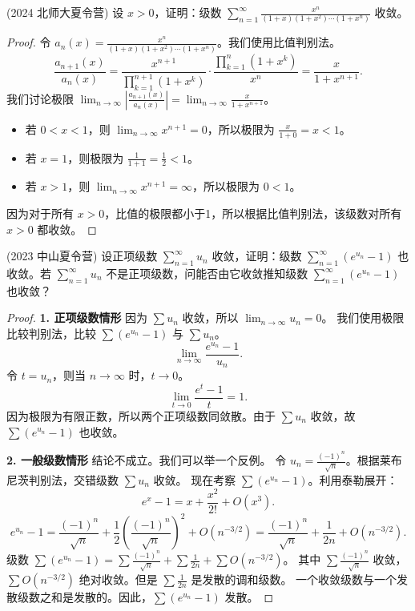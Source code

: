 \documentclass[lang=cn,10pt,thmcnt=section]{elegantbook}
\begin{document}
\begin{example}
    (2024 北师大夏令营) 设 $x > 0$，证明：级数 $\sum_{n=1}^{\infty} \frac{x^n}{(1+x)(1+x^2)\cdots(1+x^n)}$ 收敛。
\end{example}
\begin{proof}
    令 $a_n(x) = \frac{x^n}{(1+x)(1+x^2)\cdots(1+x^n)}$。我们使用比值判别法。
    \[ \frac{a_{n+1}(x)}{a_n(x)} = \frac{x^{n+1}}{\prod_{k=1}^{n+1}(1+x^k)} \cdot \frac{\prod_{k=1}^{n}(1+x^k)}{x^n} = \frac{x}{1+x^{n+1}}. \]
    我们讨论极限 $\lim_{n \to \infty} \left| \frac{a_{n+1}(x)}{a_n(x)} \right| = \lim_{n \to \infty} \frac{x}{1+x^{n+1}}$。
    \begin{itemize}
        \item 若 $0 < x < 1$，则 $\lim_{n \to \infty} x^{n+1} = 0$，所以极限为 $\frac{x}{1+0} = x < 1$。
        \item 若 $x=1$，则极限为 $\frac{1}{1+1} = \frac{1}{2} < 1$。
        \item 若 $x > 1$，则 $\lim_{n \to \infty} x^{n+1} = \infty$，所以极限为 $0 < 1$。
    \end{itemize}
    因为对于所有 $x>0$，比值的极限都小于1，所以根据比值判别法，该级数对所有 $x>0$ 都收敛。
\end{proof}

\begin{example}
    (2023 中山夏令营) 设正项级数 $\sum_{n=1}^{\infty} u_n$ 收敛，证明：级数 $\sum_{n=1}^{\infty} (e^{u_n} - 1)$ 也收敛。若 $\sum_{n=1}^{\infty} u_n$ 不是正项级数，问能否由它收敛推知级数 $\sum_{n=1}^{\infty} (e^{u_n} - 1)$ 也收敛？
\end{example}
\begin{proof}
    \textbf{1. 正项级数情形}
    因为 $\sum u_n$ 收敛，所以 $\lim_{n \to \infty} u_n = 0$。
    我们使用极限比较判别法，比较 $\sum (e^{u_n}-1)$ 与 $\sum u_n$。
    \[ \lim_{n\to\infty} \frac{e^{u_n}-1}{u_n}. \]
    令 $t=u_n$，则当 $n \to \infty$ 时，$t \to 0$。
    \[ \lim_{t \to 0} \frac{e^t-1}{t} = 1. \]
    因为极限为有限正数，所以两个正项级数同敛散。由于 $\sum u_n$ 收敛，故 $\sum(e^{u_n}-1)$ 也收敛。
    
    \textbf{2. 一般级数情形}
    结论不成立。我们可以举一个反例。
    令 $u_n = \frac{(-1)^n}{\sqrt{n}}$。根据莱布尼茨判别法，交错级数 $\sum u_n$ 收敛。
    现在考察 $\sum(e^{u_n}-1)$。利用泰勒展开：
    \[ e^x - 1 = x + \frac{x^2}{2!} + O(x^3). \]
    \[ e^{u_n}-1 = \frac{(-1)^n}{\sqrt{n}} + \frac{1}{2}\left(\frac{(-1)^n}{\sqrt{n}}\right)^2 + O(n^{-3/2}) = \frac{(-1)^n}{\sqrt{n}} + \frac{1}{2n} + O(n^{-3/2}). \]
    级数 $\sum (e^{u_n}-1) = \sum \frac{(-1)^n}{\sqrt{n}} + \sum \frac{1}{2n} + \sum O(n^{-3/2})$。
    其中 $\sum \frac{(-1)^n}{\sqrt{n}}$ 收敛，$\sum O(n^{-3/2})$ 绝对收敛。但是 $\sum \frac{1}{2n}$ 是发散的调和级数。
    一个收敛级数与一个发散级数之和是发散的。因此，$\sum(e^{u_n}-1)$ 发散。
\end{proof}
\end{document}
